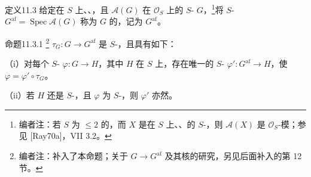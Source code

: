 \begin{SGAresult}{定义}{11.3}
给定在 $S$ 上、、，且 $\mathcal A(G)$ 在 $\mathcal O_S$ 上的 $S$- $G$，\footnote{编者注：若 $S$ 为 $\leq2$ 的，而 $X$ 是在 $S$ 上、、的 $S$-，则 $\mathcal A(X)$ 是 $\mathcal O_S$-模；参见 [Ray70a]，VII 3.2。}将 $S$- $G^{\mathrm{af}}=\operatorname{Spec}\mathcal A(G)$ 称为 $G$ 的，记为 $G^{\mathrm{af}}$。
\end{SGAresult}

\begin{SGAresult}{命题}{11.3.1}
\footnote{编者注：补入了本命题；关于 $G\to G^{\mathrm{af}}$ 及其核的研究，另见后面补入的第 12 节。} $\tau_G:G\to G^{\mathrm{af}}$ 是 $S$-，且具有如下：

（i）对每个 $S$- $\varphi:G\to H$，其中 $H$ 在 $S$ 上，存在唯一的 $S$- $\varphi':G^{\mathrm{af}}\to H$，使 $\varphi=\varphi'\circ\tau_G$。

（ii）若 $H$ 还是 $S$-，且 $\varphi$ 为 $S$-，则 $\varphi'$ 亦然。
\end{SGAresult}

